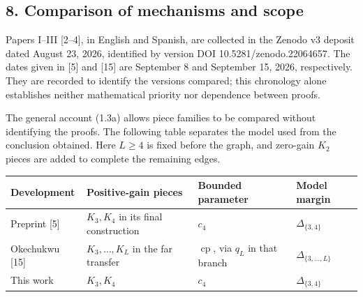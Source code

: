 \documentclass[english,11pt,a4paper]{article}
\newcounter{none}
\begin{document}
\subsection{8. Comparison of mechanisms and scope}\label{comparison-of-mechanisms-and-scope}

Papers I--III {[}2--4{]}, in English and Spanish, are collected in the Zenodo v3 deposit dated August 23, 2026, identified by version DOI {\ttfamily\small 10.\discretionary{\hbox{\ensuremath{\hookrightarrow}}}{}{}5281/\discretionary{\hbox{\ensuremath{\hookrightarrow}}}{}{}zenodo.\discretionary{\hbox{\ensuremath{\hookrightarrow}}}{}{}22064657}. The dates given in {[}5{]} and {[}15{]} are September 8 and September 15, 2026, respectively. They are recorded to identify the versions compared; this chronology alone establishes neither mathematical priority nor dependence between proofs.

The general account (1.3a) allows piece families to be compared without identifying the proofs. The following table separates the model used from the conclusion obtained. Here \(L\ge4\) is fixed before the graph, and zero-gain \(K_2\) pieces are added to complete the remaining edges.


{\def\LTcaptype{none} %
\begin{longtable}[c]{@{}
  >{\raggedright\arraybackslash}p{}
  >{\raggedright\arraybackslash}p{}
  >{\raggedright\arraybackslash}p{}
  >{\raggedright\arraybackslash}p{}@{}}
\toprule\noalign{}
\begin{minipage}[b]{\linewidth}\raggedright
Development
\end{minipage} & \begin{minipage}[b]{\linewidth}\raggedright
Positive-gain pieces
\end{minipage} & \begin{minipage}[b]{\linewidth}\raggedright
Bounded parameter
\end{minipage} & \begin{minipage}[b]{\linewidth}\raggedright
Model margin
\end{minipage} \\
\midrule\noalign{}
\endhead
\bottomrule\noalign{}
\endlastfoot
Preprint {[}5{]} & \(K_3,K_4\) in its final construction & \(c_4\) & \(\Delta_{\{3,4\}}\) \\
Okechukwu {[}15{]} & \(K_3,\ldots,K_L\) in the far transfer & \(\operatorname{cp}\), via \(q_L\) in that branch & \(\Delta_{\{3,\ldots,L\}}\) \\
This work & \(K_3,K_4\) & \(c_4\) & \(\Delta_{\{3,4\}}\) \\
\end{longtable}
}
\end{document}
